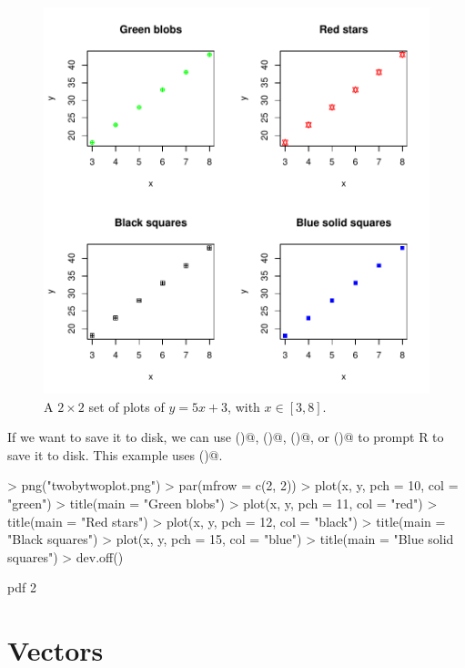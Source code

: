 \documentclass[11pt, oneside, reqno]{article}
\begin{document}
\begin{figure}
\begin{center}
\includegraphics{exercises-twobytwo}
\end{center}
\caption{A $2\times 2$ set of plots of $y=5x+3$, with $x\in [3,8]$.}
\label{fig:twobytwo}
\end{figure}
\eans

If we want to save it to disk, we can use \verb@png()@, \verb@jpeg()@, \verb@pdf()@, or \verb@postscript()@ to prompt R to save it to disk. This example uses \verb@png()@.

\begin{Schunk}
\begin{Sinput}
> png("twobytwoplot.png")
> par(mfrow = c(2, 2))
> plot(x, y, pch = 10, col = "green")
> title(main = "Green blobs")
> plot(x, y, pch = 11, col = "red")
> title(main = "Red stars")
> plot(x, y, pch = 12, col = "black")
> title(main = "Black squares")
> plot(x, y, pch = 15, col = "blue")
> title(main = "Blue solid squares")
> dev.off()
\end{Sinput}
\begin{Soutput}
pdf 
  2 
\end{Soutput}
\end{Schunk}
\eans

\section{Vectors}
\end{document}
